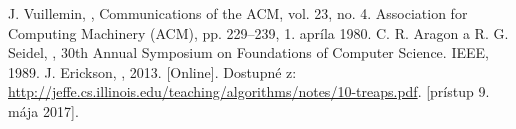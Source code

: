 \documentclass[a4paper, 12pt]{article}
\theoremstyle{definition}
\begin{document}
\begin{thebibliography}{9}
    J. Vuillemin, , Communications of
        the ACM, vol. 23, no. 4. Association for Computing Machinery (ACM), pp.
        229–239, 1. apríla 1980.
    C. R. Aragon a R. G. Seidel, , 30th Annual
        Symposium on Foundations of Computer Science. IEEE, 1989.
    J. Erickson, , 2013. [Online]. Dostupné
        z:
        \url{http://jeffe.cs.illinois.edu/teaching/algorithms/notes/10-treaps.pdf}.
        [prístup 9. mája 2017].
\end{thebibliography}
\end{document}
